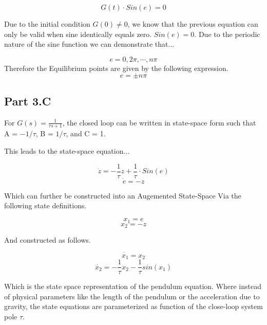     $$ G(t) \cdot Sin(e) = 0 $$

    Due to the initial condition $G(0) \neq 0 $, we know that the previous equation can only be valid when sine identically equals zero. $ Sin(e) = 0 $. Due to the periodic nature of the sine function we can demonstrate that...

    $$ e = 0, 2\pi, \cdots, n\pi $$
    Therefore the Equilibrium points are given by the following expression.
    $$ e = \pm n \pi$$


    \subsection*{Part 3.C}

    For $G(s) = \frac{1}{\tau s + 1}$, the closed loop can be written in state-space form such that A = $-1/\tau$, B = $1/\tau$, and C = 1.

    This leads to the state-space equation...

    $$ \dot{z} = -\frac{1}{\tau}z + \frac{1}{\tau} \cdot Sin(e)  $$
    $$ \dot{e} = -z $$

    Which can further be constructed into an Augemented State-Space Via the following state definitions.

    $$ x_{1} = e $$
    $$ x_{2} = -z $$

    And constructed as follows.


    $$ \dot{x_1} = x_{2} $$
    $$ \dot{x_2} = - \frac{1}{\tau} x_2 - \frac{1}{\tau} sin(x_1)$$

    Which is the state space representation of the pendulum equation. Where instead of physical parameters like the length of the pendulum or the acceleration due to gravity, the state equations are parameterized as function of the close-loop system pole $\tau$.
